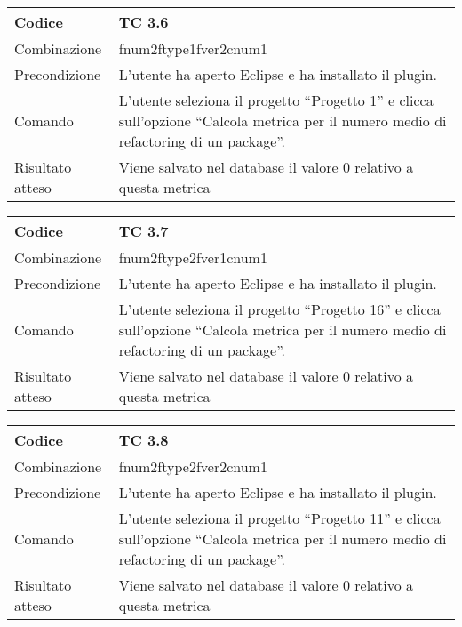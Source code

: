 \begin{table}[ht]
\begin{tabular}{|p{3cm}|p{9cm}|}
\hline
\cellcolor{lightgray}Codice				& TC 3.6								\\
\hline
\cellcolor{lightgray}Combinazione		& fnum2ftype1fver2cnum1									\\
\hline
\cellcolor{lightgray}Precondizione		& L'utente ha aperto Eclipse e ha installato il plugin.				\\
\hline
\cellcolor{lightgray}Comando			& L'utente seleziona il progetto ``Progetto 1''  e clicca sull'opzione ``Calcola metrica per il numero medio di refactoring di un package''.	\\
\hline
\cellcolor{lightgray}Risultato atteso	& Viene salvato nel database il valore 0 relativo a questa metrica	\\
\hline
\end{tabular}
\end{table}

\begin{table}[ht]
\begin{tabular}{|p{3cm}|p{9cm}|}
\hline
\cellcolor{lightgray}Codice				& TC 3.7								\\
\hline
\cellcolor{lightgray}Combinazione		& fnum2ftype2fver1cnum1								\\
\hline
\cellcolor{lightgray}Precondizione		& L'utente ha aperto Eclipse e ha installato il plugin.									\\
\hline
\cellcolor{lightgray}Comando			& L'utente seleziona il progetto ``Progetto 16''  e clicca sull'opzione ``Calcola metrica per il numero medio di refactoring di un package''.	\\
\hline
\cellcolor{lightgray}Risultato atteso	& Viene salvato nel database il valore 0 relativo a questa metrica	\\
\hline
\end{tabular}
\end{table}

\begin{table}[ht]
\begin{tabular}{|p{3cm}|p{9cm}|}
\hline
\cellcolor{lightgray}Codice				& TC 3.8								\\
\hline
\cellcolor{lightgray}Combinazione		& fnum2ftype2fver2cnum1 									\\
\hline
\cellcolor{lightgray}Precondizione		& L'utente ha aperto Eclipse e ha installato il plugin.				\\
\hline
\cellcolor{lightgray}Comando			& L'utente seleziona il progetto ``Progetto 11''  e clicca sull'opzione ``Calcola metrica per il numero medio di refactoring di un package''.	\\
\hline
\cellcolor{lightgray}Risultato atteso	& Viene salvato nel database il valore 0 relativo a questa metrica	\\
\hline
\end{tabular}
\end{table}


